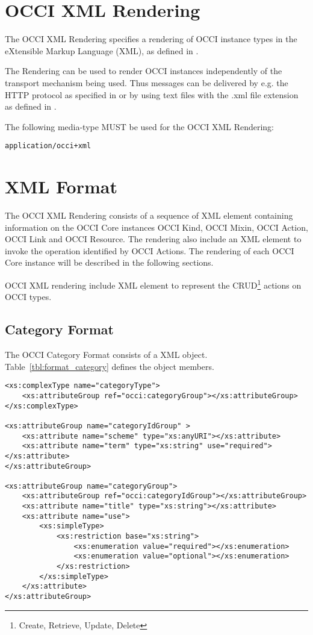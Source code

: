 \documentclass[10pt,a4paper]{article}
\begin{document}
\section{OCCI XML Rendering}

The OCCI XML Rendering specifies a rendering of OCCI instance types in
the eXtensible Markup Language (XML), as defined in \cite{w3c:xml11}.

The Rendering can be used to render OCCI instances independently of the
transport mechanism being used. Thus messages can be delivered by e.g. the HTTP
protocol as specified in \cite{occi:http_rendering} or by using text files with
the .xml file extension as defined in \cite{w3c:xml11}.

The following media-type MUST be used for the OCCI XML Rendering:

{\tt application/occi+xml}

\section{XML Format}
\label{sec:xml_format}

The OCCI XML Rendering consists of a sequence of XML element containing
information on the OCCI Core instances OCCI Kind, OCCI Mixin, OCCI
Action, OCCI Link and OCCI Resource. The rendering also include an XML
element to invoke the operation identified by OCCI Actions.
The rendering of each OCCI Core instance will be described in the
following sections.


OCCI XML rendering include XML element to represent the
CRUD\footnote{Create, Retrieve, Update, Delete} actions on OCCI types.

\subsection{Category Format}
\label{sec:format_category}
The OCCI Category Format consists of a XML object.
Table~\ref{tbl:format_category} defines the object members.

\begin{lstlisting}
<xs:complexType name="categoryType">	
	<xs:attributeGroup ref="occi:categoryGroup"></xs:attributeGroup>
</xs:complexType>

<xs:attributeGroup name="categoryIdGroup" >
	<xs:attribute name="scheme" type="xs:anyURI"></xs:attribute>
	<xs:attribute name="term" type="xs:string" use="required"></xs:attribute>
</xs:attributeGroup>

<xs:attributeGroup name="categoryGroup">	
	<xs:attributeGroup ref="occi:categoryIdGroup"></xs:attributeGroup>
	<xs:attribute name="title" type="xs:string"></xs:attribute>
	<xs:attribute name="use">
		<xs:simpleType>
			<xs:restriction base="xs:string">
				<xs:enumeration value="required"></xs:enumeration>
				<xs:enumeration value="optional"></xs:enumeration>
			</xs:restriction>
		</xs:simpleType>
	</xs:attribute>
</xs:attributeGroup>
\end{lstlisting}
\end{document}
